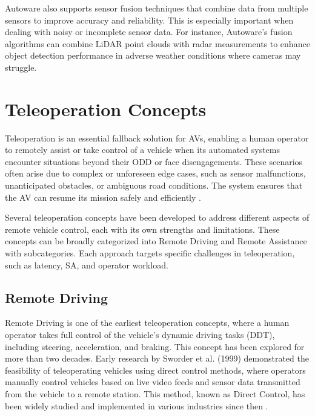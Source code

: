 Autoware also supports sensor fusion techniques that combine data from multiple sensors to improve accuracy and reliability. This is especially important when dealing with noisy or incomplete sensor data. For instance, Autoware's fusion algorithms can combine LiDAR point clouds with radar measurements to enhance object detection
performance in adverse weather conditions where cameras may struggle.
\section{Teleoperation Concepts}

Teleoperation is an essential fallback solution for \acp{AV},
enabling a human operator to remotely assist or take control of a vehicle when
its automated systems encounter situations beyond their \ac{ODD}
or face disengagements. These scenarios often arise due to complex or unforeseen edge cases,
such as sensor malfunctions, unanticipated obstacles, or ambiguous road conditions.
The system ensures that the \ac{AV} can resume its mission safely and efficiently \cite{Brecht}.

Several teleoperation concepts have been developed to address different aspects of remote vehicle control, each with its own strengths and limitations. These concepts can be broadly categorized into Remote Driving and Remote Assistance with subcategories. Each approach targets specific challenges in teleoperation, such as latency, \ac{SA}, and operator workload.

\subsection{Remote Driving}
Remote Driving is one of the earliest teleoperation concepts,
where a human operator takes full control of the vehicle's
dynamic driving tasks (DDT), including steering, acceleration,
and braking. This concept has been explored for more than two decades.
Early research by Sworder et al. \cite{sworder1999performance} (1999) demonstrated the feasibility
of teleoperating vehicles using direct control methods, where
operators manually control vehicles based on live video feeds and
sensor data transmitted from the vehicle to a remote station.
This method, known as Direct Control, has been widely studied
and implemented in various industries since then \cite{Gnatzig,chucholowski2014teleoperated,Tang}.

